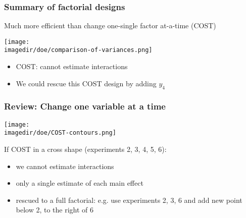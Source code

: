 \begin{frame}\frametitle{Summary of factorial designs}
	\begin{block}{Much more efficient than change one-single factor at-a-time (COST)}
		\begin{center}
			\texttt{[image: \\imagedir/doe/comparison-of-variances.png]}
		\end{center}
	\end{block}
	\begin{itemize}
		\item	COST: cannot estimate interactions
		\item	We could rescue this COST design by adding $y_4$
	\end{itemize}
\end{frame}

\begin{frame}\frametitle{Review: Change one variable at a time}
	\begin{center}
		\texttt{[image: \\imagedir/doe/COST-contours.png]}
	\end{center}
	If COST in a cross shape (experiments 2, 3, 4, 5, 6):
	\begin{itemize}
		\item	we cannot estimate interactions
		\item	only a single estimate of each main effect
		\item	rescued to a full factorial: e.g. use experiments 2, 3, 6 and add new point below 2, to the right of 6
	\end{itemize}
\end{frame}

